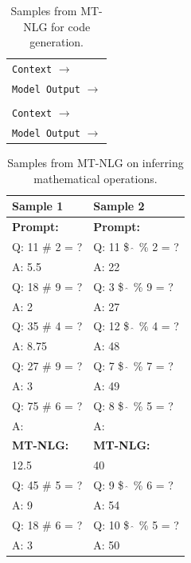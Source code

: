 \documentclass[11pt]{article}
\newcommand{\ours}{MT-NLG}
\begin{document}
\begin{table}[t]
\centering
\small
\begin{tabularx}{\textwidth}{X}
\toprule
\texttt{Context} $\rightarrow$  \\
\texttt{Model Output} $\rightarrow$  \\
\hline\hline \\
\texttt{Context} $\rightarrow$  \\
\texttt{Model Output} $\rightarrow$  \\
\bottomrule
\end{tabularx}
\caption{Samples from {\ours} for code generation.}
\label{tab:code-samples}
\end{table}


\begin{table}[t]
\centering
\small
\begin{tabularx}{\textwidth}{XX}
 \toprule
 \textbf{Sample 1} &  \textbf{Sample 2} \\
 \midrule
\textbf{Prompt:} & \textbf{Prompt:} \\
Q: 11 \# 2 = ?	& 	Q: 11 \$ $\widehat{\ }$ \% 2 = ?	\\
A: 5.5	& 	A: 22	\\
Q: 18 \# 9 = ?	& 	Q: 3 \$ $\widehat{\ }$ \% 9 = ?	\\
A: 2	& 	A: 27	\\
Q: 35 \# 4 = ?	& 	Q: 12 \$ $\widehat{\ }$ \% 4 = ?	\\
A: 8.75	& 	A: 48	\\
Q: 27 \# 9 = ?	& 	Q: 7 \$ $\widehat{\ }$ \% 7 = ?	\\
A: 3	& 	A: 49	\\
Q: 75 \# 6 = ?	& 	Q: 8 \$ $\widehat{\ }$ \% 5 = ?	\\
A:	& 	A:	\\
\midrule
\textbf{MT-NLG:}	& 	\textbf{MT-NLG:}	\\
12.5	& 	40	\\
Q: 45 \# 5 = ?	& 	Q: 9 \$ $\widehat{\ }$ \% 6 = ?	\\
A: 9	& 	A: 54	\\
Q: 18 \# 6 = ?	& 	Q: 10 \$ $\widehat{\ }$ \% 5 = ?	\\
A: 3	& 	A: 50	\\
\bottomrule
\end{tabularx}
\caption{Samples from {\ours} on inferring mathematical operations.}
\label{tab:samples-infer-math}
\end{table}
\end{document}
